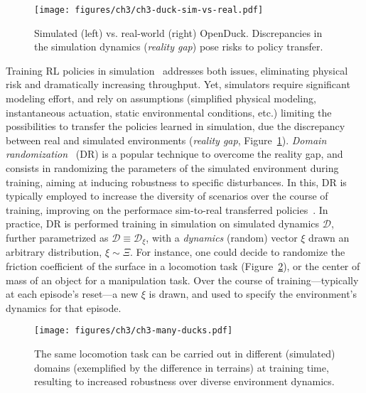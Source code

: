 \begin{figure}
    \centering
    \texttt{[image: figures/ch3/ch3-duck-sim-vs-real.pdf]}
    \caption{Simulated (left) vs. real-world (right) OpenDuck. Discrepancies in the simulation dynamics (\emph{reality gap}) pose risks to policy transfer.}
    \label{fig:synthetic-vs-real-duck}
\end{figure}

Training RL policies in simulation~\citep{tobinDomainRandomizationTransferring2017} addresses both issues, eliminating physical risk and dramatically increasing throughput.
Yet, simulators require significant modeling effort, and rely on assumptions (simplified physical modeling, instantaneous actuation, static environmental conditions, etc.) limiting the possibilities to transfer the policies learned in simulation, due the discrepancy between real and simulated environments (\emph{reality gap}, Figure~\ref{fig:synthetic-vs-real-duck}).
\emph{Domain randomization}~\citep{tobinDomainRandomizationTransferring2017} (DR) is a popular technique to overcome the reality gap, and consists in randomizing the parameters of the simulated environment during training, aiming at inducing robustness to specific disturbances.
In this, DR is typically employed to increase the diversity of scenarios over the course of training, improving on the performace sim-to-real transferred policies~\citep{akkayaSolvingRubiksCube2019,antonovaReinforcementLearningPivoting2017,jiDribbleBotDynamicLegged2023}.
In practice, DR is performed training in simulation on simulated dynamics \( \mathcal D \), further parametrized as \( \mathcal D \equiv \mathcal D_\xi \), with a \emph{dynamics} (random) vector \( \xi \) drawn an arbitrary distribution, \( \xi \sim \Xi \).
For instance, one could decide to randomize the friction coefficient of the surface in a locomotion task (Figure~\ref{fig:ducks-on-terrains}), or the center of mass of an object for a manipulation task.
Over the course of training---typically at each episode's reset---a new \( \xi \) is drawn, and used to specify the environment's dynamics for that episode.

\begin{figure}
    \centering
    \texttt{[image: figures/ch3/ch3-many-ducks.pdf]}
    \caption{The same locomotion task can be carried out in different (simulated) domains (exemplified by the difference in terrains) at training time, resulting to increased robustness over diverse environment dynamics.}
    \label{fig:ducks-on-terrains}
\end{figure}

